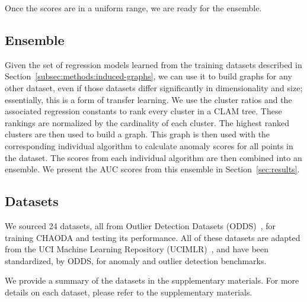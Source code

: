 
Once the scores are in a uniform range, we are ready for the ensemble.


\subsection{Ensemble}\label{subsec:methods:ensemble}
Given the set of regression models learned from the training datasets described in Section~\ref{subsec:methods:induced-graphs}, we can use it to build graphs for any other dataset, even if those datasets differ significantly in dimensionality and size; essentially, this is a form of transfer learning.
We use the cluster ratios and the associated regression constants to rank every cluster in a CLAM tree.
These rankings are normalized by the cardinality of each cluster.
The highest ranked clusters are then used to build a graph.
This graph is then used with the corresponding individual algorithm to calculate anomaly scores for all points in the dataset.
The scores from each individual algorithm are then combined into an ensemble.
We present the AUC scores from this ensemble in Section~\ref{sec:results}.



\subsection{Datasets}\label{subsec:methods:datasets}

We sourced 24 datasets, all from Outlier Detection Datasets (ODDS)~\cite{rayana2016odds}, for training CHAODA and testing its performance.
All of these datasets are adapted from the UCI Machine Learning Repository (UCIMLR)~\cite{UCIMLR}, and have been standardized, by ODDS, for anomaly and outlier detection benchmarks.

We provide a summary of the datasets in the supplementary materials.
For more details on each dataset, please refer to the supplementary materials.



